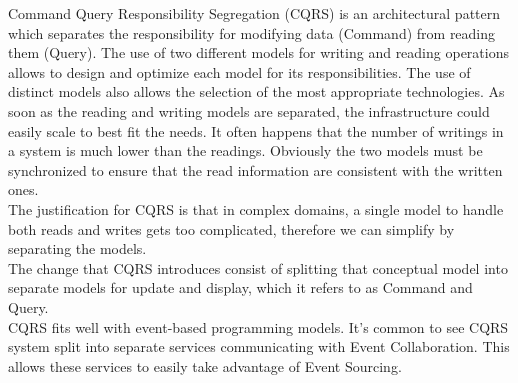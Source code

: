 \newpage
{}
Command Query Responsibility Segregation (CQRS) is an architectural pattern which separates the responsibility for modifying data (Command) from reading them (Query). The use of two different models for writing and reading operations allows to design and optimize each model for its responsibilities. The use of distinct models also allows the selection of the most appropriate technologies. As soon as the reading and writing models are separated, the infrastructure could easily scale to best fit the needs. It often happens that the number of writings in a system is much lower than the readings. Obviously the two models must be synchronized to ensure that the read information are consistent with the written ones.\\
The justification for CQRS is that in complex domains, a single model to handle both reads and writes gets too complicated, therefore we can simplify by separating the models.\\
The change that CQRS introduces consist of splitting that conceptual model into separate models for update and display, which it refers to as Command and Query.\\
CQRS fits well with event-based programming models. It's common to see CQRS system split into separate services communicating with Event Collaboration. This allows these services to easily take advantage of Event Sourcing.


